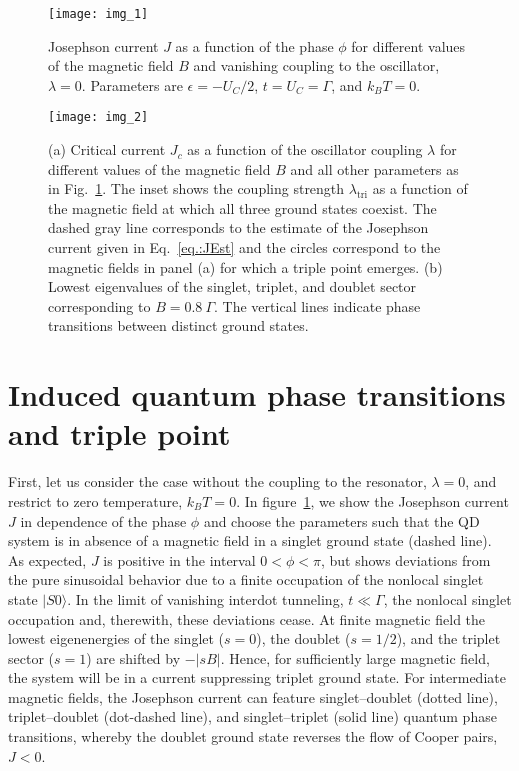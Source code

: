 \documentclass[aps,prb,twocolumn,superscriptaddress,amsmath,amssymb,longbibliography]{revtex4-1}
\newcommand{\abs}[1]{\ensuremath{|#1|}}
\newcommand{\ket}[1]{\ensuremath{|#1\rangle}}
\begin{document}
	\begin{figure}[t]
		\texttt{[image: img\_1]}\caption{\label{fig.:phaseTransition}%
		Josephson current $J$ as a function of the phase $\phi$ for different values of the magnetic field $B$ and vanishing coupling to the oscillator, $\lambda=0$. 
		Parameters are $\epsilon=-U_C/2$,  $t=U_C=\Gamma$, and $k_B T=0$.}%
	\end{figure}%
	
	\begin{figure}[t]
		\texttt{[image: img\_2]}\caption{\label{fig.:JCritical}%
		(a) Critical current $J_c$ as a function of the oscillator coupling $\lambda$ for different values of the magnetic field $B$ and all other
		parameters as in Fig.~\ref{fig.:phaseTransition}. The inset shows the coupling strength $\lambda_{\textrm{tri}}$ as a function of the magnetic field
		at which all three ground states coexist. The dashed gray line corresponds to the estimate of the Josephson current given in Eq.~\eqref{eq.:JEst}
		and the circles correspond to the magnetic fields in panel (a) for which a triple point emerges.
		(b) Lowest eigenvalues of the singlet, triplet, and doublet sector corresponding to $B=0.8\:\Gamma$. The vertical lines indicate phase transitions between distinct ground states.
		}
	\end{figure}
	 
	\section{Induced quantum phase transitions and triple point}
	First, let us consider the case without the coupling to the resonator, $\lambda=0$, and restrict to zero temperature, $k_BT=0$. 
	In figure~\ref{fig.:phaseTransition}, we show the Josephson current $J$ in dependence of the phase $\phi$ and choose
	the parameters such that the QD system is in absence of a magnetic field in a singlet ground state (dashed line). As expected,
	$J$ is positive in the interval $0<\phi<\pi$, but shows deviations from the pure sinusoidal behavior due to  a finite
	occupation of the nonlocal singlet state $\ket{S0}$. In the limit of vanishing interdot tunneling, $t\ll\Gamma$, the nonlocal 
	singlet occupation and, therewith, these deviations cease. At finite magnetic field the lowest eigenenergies of the singlet 
	($s=0$), the doublet ($s=1/2$), and  the triplet sector ($s=1$) are shifted by $-\abs{sB}$. Hence, for sufficiently large magnetic 
	field, the system will be in a  current suppressing triplet ground state. For intermediate magnetic fields, the Josephson current can feature
	singlet--doublet (dotted line), triplet--doublet (dot-dashed line), and singlet--triplet (solid line) quantum phase transitions, whereby the doublet 
	ground state reverses the flow of Cooper pairs, $J<0$.
	
\end{document}
